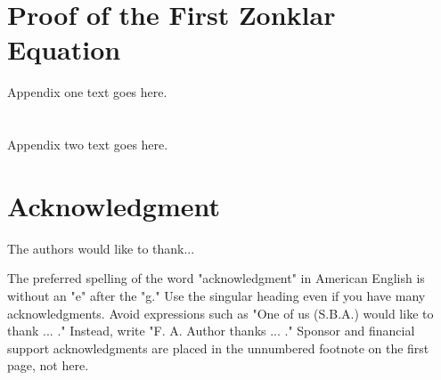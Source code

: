\documentclass[journal]{IAENGtran}
\begin{document}
\appendices
\section{Proof of the First Zonklar Equation}
Appendix one text goes here.

\section{}
Appendix two text goes here.


\section*{Acknowledgment}


The authors would like to thank...

The preferred spelling of the word "acknowledgment" in American
English is without an "e" after the "g." Use the singular heading
even if you have many acknowledgments. Avoid expressions such as
"One of us (S.B.A.) would like to thank ... ." Instead, write "F. A.
Author thanks ... ." Sponsor and financial support acknowledgments
are placed in the unnumbered footnote on the first page, not here.


\ifCLASSOPTIONcaptionsoff
  \newpage
\fi




\end{document}
